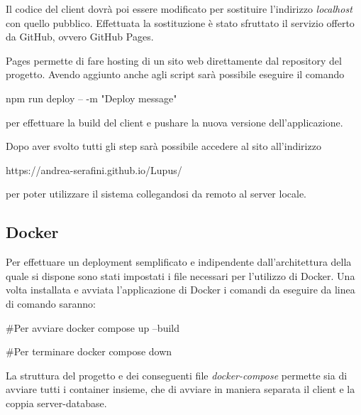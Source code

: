 Il codice del client dovrà poi essere modificato per sostituire l'indirizzo \emph{localhost} con quello pubblico. Effettuata la sostituzione è stato sfruttato il servizio offerto da GitHub, ovvero GitHub Pages.

Pages permette di fare hosting di un sito web direttamente dal repository del progetto. Avendo aggiunto anche  agli script sarà possibile eseguire il comando
\begin{lcverbatim}
    npm run deploy -- -m "Deploy message"
\end{lcverbatim}
per effettuare la build del client e pushare la nuova versione dell'applicazione.

Dopo aver svolto tutti gli step sarà possibile accedere al sito all'indirizzo
\begin{lcverbatim}
    https://andrea-serafini.github.io/Lupus/
\end{lcverbatim}
per poter utilizzare il sistema collegandosi da remoto al server locale.

\subsection{Docker}
Per effettuare un deployment semplificato e indipendente dall'architettura della quale si dispone sono stati impostati i file necessari per l'utilizzo di Docker.
Una volta installata e avviata l'applicazione di Docker i comandi da eseguire da linea di comando saranno:
\begin{lcverbatim}
#Per avviare
    docker compose up --build

#Per terminare
    docker compose down
\end{lcverbatim}

La struttura del progetto e dei conseguenti file \emph{docker-compose} permette sia di avviare tutti i container insieme, che di avviare in maniera separata il client e la coppia server-database.